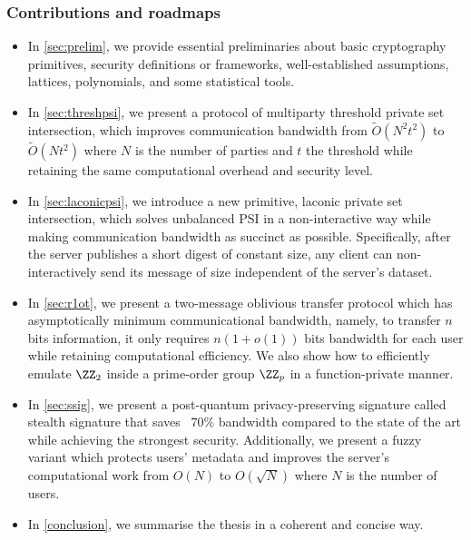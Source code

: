 \subsubsection{Contributions and roadmaps}
\begin{itemize}
    \item In \cref{sec:prelim}, we provide essential preliminaries about basic cryptography primitives, security definitions or frameworks, well-established assumptions, lattices, polynomials, and some statistical tools.
    \item In \cref{sec:threshpsi}, we present a protocol of multiparty threshold private set intersection, which improves communication bandwidth from $\tilde{O}(N^2t^2)$ to $\tilde{O}(Nt^2)$ where $N$ is the number of parties and $t$ the threshold while retaining the same computational overhead and security level.
    \item In \cref{sec:laconicpsi}, we introduce a new primitive, laconic private set intersection, which solves unbalanced PSI in a non-interactive way while making communication bandwidth as succinct as possible. Specifically, after the server publishes a short digest of constant size, any client can non-interactively send its message of size independent of the server's dataset.
    \item In \cref{sec:r1ot}, we present a two-message oblivious transfer protocol which has asymptotically minimum communicational bandwidth, namely, to transfer $n$ bits information, it only requires $n(1+o(1))$ bits bandwidth for each user while retaining computational efficiency. We also show how to efficiently emulate $\ZZ_2$ inside a prime-order group $\ZZ_p$ in a function-private manner.
    \item In \cref{sec:ssig}, we present a post-quantum privacy-preserving signature called stealth signature that saves ~$70\%$ bandwidth compared to the state of the art while  achieving the strongest security. Additionally, we present a fuzzy variant which protects users' metadata and improves the server's computational work from $O(N)$ to $O(\sqrt{N})$ where $N$ is the number of users.
    \item In \cref{conclusion}, we summarise the thesis in a coherent and concise way.
\end{itemize}
